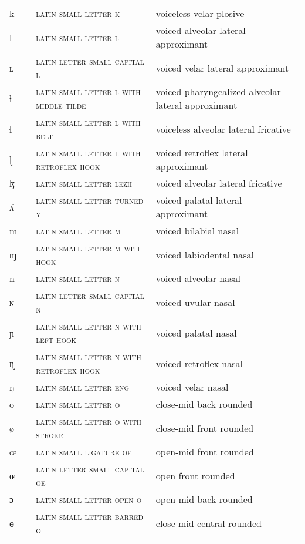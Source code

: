 \begin{center}
\begin{xtabular}{ l l L{4.5cm} L{4.5cm} }
k &  & \textsc{latin small letter k} & voiceless velar plosive \\ 
l &  & \textsc{latin small letter l} & voiced alveolar lateral approximant \\ 
ʟ &  & \textsc{latin letter small capital l} & voiced velar lateral approximant \\ 
ɫ &  & \textsc{latin small letter l with middle tilde} & voiced pharyngealized alveolar lateral approximant \\ 
ɬ &  & \textsc{latin small letter l with belt} & voiceless alveolar lateral fricative \\ 
ɭ &  & \textsc{latin small letter l with retroflex hook} & voiced retroflex lateral approximant \\ 
ɮ &  & \textsc{latin small letter lezh} & voiced alveolar lateral fricative \\ 
ʎ &  & \textsc{latin small letter turned y} & voiced palatal lateral approximant \\ 
m &  & \textsc{latin small letter m} & voiced bilabial nasal \\ 
ɱ &  & \textsc{latin small letter m with hook} & voiced labiodental nasal \\ 
n &  & \textsc{latin small letter n} & voiced alveolar nasal \\ 
ɴ &  & \textsc{latin letter small capital n} & voiced uvular nasal \\ 
ɲ &  & \textsc{latin small letter n with left hook} & voiced palatal nasal \\ 
ɳ &  & \textsc{latin small letter n with retroflex hook} & voiced retroflex nasal \\ 
ŋ &  & \textsc{latin small letter eng} & voiced velar nasal \\ 
o &  & \textsc{latin small letter o} & close-mid back rounded \\ 
ø &  & \textsc{latin small letter o with stroke} & close-mid front rounded \\ 
œ &  & \textsc{latin small ligature oe} & open-mid front rounded \\ 
ɶ &  & \textsc{latin letter small capital oe} & open front rounded \\ 
ɔ &  & \textsc{latin small letter open o} & open-mid back rounded \\ 
ɵ &  & \textsc{latin small letter barred o} & close-mid central rounded \\ 

\end{xtabular}
\end{center}
